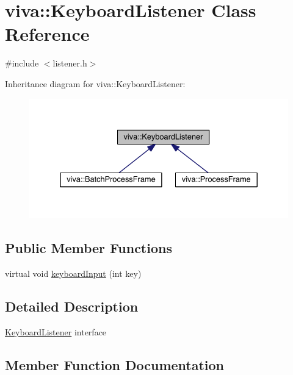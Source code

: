 \hypertarget{classviva_1_1_keyboard_listener}{}\section{viva\+:\+:Keyboard\+Listener Class Reference}
\label{classviva_1_1_keyboard_listener}


{\ttfamily \#include $<$listener.\+h$>$}



Inheritance diagram for viva\+:\+:Keyboard\+Listener\+:
\nopagebreak
\begin{figure}[H]
\begin{center}
\leavevmode
\includegraphics[width=332pt]{classviva_1_1_keyboard_listener__inherit__graph}
\end{center}
\end{figure}
\subsection*{Public Member Functions}
\begin{DoxyCompactItemize}
\item 
virtual void \hyperlink{classviva_1_1_keyboard_listener_a903947e765f8130cfe1b3ce882c95998}{keyboard\+Input} (int key)
\end{DoxyCompactItemize}


\subsection{Detailed Description}
\hyperlink{classviva_1_1_keyboard_listener}{Keyboard\+Listener} interface 

\subsection{Member Function Documentation}
